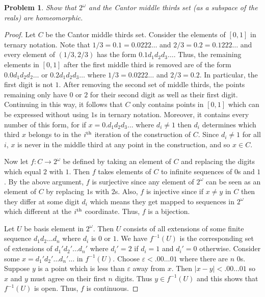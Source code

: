 \documentclass{article}
\newtheorem{problem}{Problem}
\begin{document}
\begin{problem}
Show that $2^{\omega}$ and the Cantor middle thirds set (as a subspace of the reals) are homeomorphic.
\end{problem}
\begin{proof}
Let $C$ be the Cantor middle thirds set. Consider the elements of $[0,1]$ in ternary notation. Note that $1/3 = 0.1 = 0.0222 \dots$ and $2/3 = 0.2 = 0.1222 \dots$ and every element of $(1/3,2/3)$ has the form $0.1d_1d_2d_3 \dots$. Thus, the remaining elements in $[0,1]$ after the first middle third is removed are of the form $0.0d_1d_2d_2 \dots$ or $0.2d_1d_2d_3 \dots$ where $1/3 = 0.0222 \dots$ and $2/3 = 0.2$. In particular, the first digit is not $1$. After removing the second set of middle thirds, the points remaining only have $0$ or $2$ for their second digit as well as their first digit. Continuing in this way, it follows that $C$ only contains points in $[0,1]$ which can be expressed without using $1$s in ternary notation. Moreover, it contains every number of this form, for if $x = 0.d_1d_2d_3 \dots$ where $d_i \neq 1$ then $d_i$ determines which third $x$ belongs to in the $i^{\textup{th}}$ iteration of the construction of $C$. Since $d_i \neq 1$ for all $i$, $x$ is never in the middle third at any point in the construction, and so $x \in C$.

Now let $f : C \to 2^{\omega}$ be defined by taking an element of $C$ and replacing the digits which equal $2$ with $1$. Then $f$ takes elements of $C$ to infinite sequences of $0$s and $1$. By the above argument, $f$ is surjective since any element of $2^{\omega}$ can be seen as an element of $C$ by replacing $1$s with $2$s. Also, $f$ is injective since if $x \neq y$ in $C$ then they differ at some digit $d_i$ which means they get mapped to sequences in $2^{\omega}$ which different at the $i^{\textup{th}}$ coordinate. Thus, $f$ is a bijection.

Let $U$ be basis element in $2^{\omega}$. Then $U$ consists of all extensions of some finite sequence $d_1d_2 \dots d_n$ where $d_i$ is $0$ or $1$. We have $f^{-1}(U)$ is the corresponding set of extensions of $d_1'd_2' \dots d_n'$ where $d_i' = 2$ if $d_i = 1$ and $d_i' = 0$ otherwise. Consider some $x = d_1'd_2' \dots d_n' \dots$ in $f^{-1}(U)$. Choose $\varepsilon < .00 \dots 01$ where there are $n$ $0$s. Suppose $y$ is a point which is less than $\varepsilon$ away from $x$. Then $|x-y| < .00 \dots 01$ so $x$ and $y$ must agree on their first $n$ digits. Thus $y \in f^{-1}(U)$ and this shows that $f^{-1}(U)$ is open. Thus, $f$ is continuous.


\end{proof}
\end{document}
